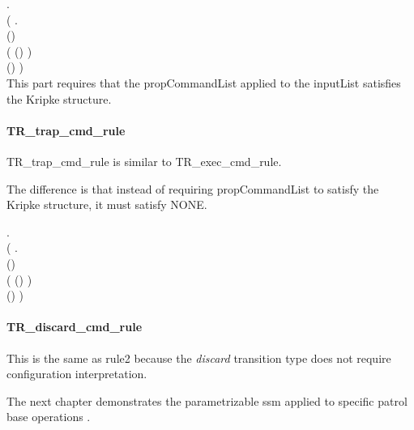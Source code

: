 \documentclass[../../main/main.tex]{subfiles}
\begin{document}
\HOLTokenTurnstile{} 
\HOLSymConst{\HOLTokenForall{}}      .\\
\hspace{0.5cm}(\HOLSymConst{\HOLTokenForall{}}  .\\
\hspace{0.9cm} (\HOLSymConst{,}\HOLSymConst{,})\\
\hspace{1.1cm}( 
(\HOLSymConst{::}) 
) \\
\HOLSymConst{\HOLTokenImp{}}(\HOLSymConst{,}\HOLSymConst{,})   ) \\

This part requires that the propCommandList applied to the inputList satisfies the Kripke structure.

\paragraph*{TR_trap_cmd_rule}
TR_trap_cmd_rule is similar to TR_exec_cmd_rule. 

\HOLssmTheoremsTRXXtrapXXcmdXXrule

The difference is that instead of requiring propCommandList to satisfy the Kripke structure, it must satisfy NONE.  

\HOLTokenTurnstile{} 
\HOLSymConst{\HOLTokenForall{}}      .\\
\hspace{0.5cm} (\HOLSymConst{\HOLTokenForall{}}  .\\
\hspace{0.9cm} (\HOLSymConst{,}\HOLSymConst{,})\\
\hspace{1.1cm}( 
(\HOLSymConst{::}) 
) \\
\HOLSymConst{\HOLTokenImp{}} (\HOLSymConst{,}\HOLSymConst{,})   ) 



\paragraph*{TR_discard_cmd_rule}
This is the same as rule2 because the \textit{discard} transition type does not require configuration interpretation.


The next chapter demonstrates the parametrizable ssm applied to specific patrol base operations .
\end{document}
